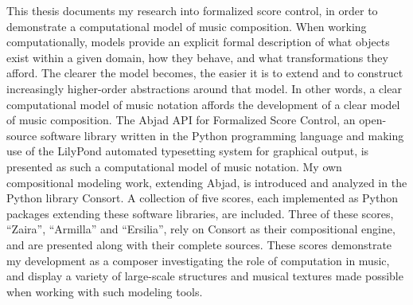 
This thesis documents my research into formalized score control, in order to
demonstrate a computational model of music composition. When working
computationally, models provide an explicit formal description of what objects
exist within a given domain, how they behave, and what transformations they
afford. The clearer the model becomes, the easier it is to extend and to
construct increasingly higher-order abstractions around that model. In other
words, a clear computational model of music notation affords the development of
a clear model of music composition. The Abjad API for Formalized Score Control,
an open-source software library written in the Python programming language and
making use of the LilyPond automated typesetting system for graphical output,
is presented as such a computational model of music notation. My own
compositional modeling work, extending Abjad, is introduced and analyzed in the
Python library Consort. A collection of five scores, each implemented as Python
packages extending these software libraries, are included. Three of these
scores, \enquote{Zaira}, \enquote{Armilla} and \enquote{Ersilia}, rely on
Consort as their compositional engine, and are presented along with their
complete sources. These scores demonstrate my development as a composer
investigating the role of computation in music, and display a variety of
large-scale structures and musical textures made possible when working with
such modeling tools.